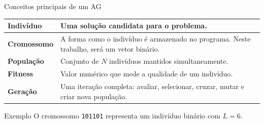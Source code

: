 \documentclass[aspectratio=169,11pt]{beamer}
\newcommand{\bits}[1]{\texttt{#1}}
\begin{document}

\begin{frame}{Conceitos principais de um AG}

    \vspace{0.05cm}

    \renewcommand{\arraystretch}{1.25}
    \begin{tabularx}{\textwidth}{>{\bfseries}p{} X}
        Indivíduo & Uma solução candidata para o problema. \\
        \hline
        Cromossomo & A forma como o indivíduo é armazenado no programa. Neste trabalho, será um vetor binário. \\
        \hline
        População & Conjunto de $N$ indivíduos mantidos simultaneamente. \\
        \hline
        Fitness & Valor numérico que mede a qualidade de um indivíduo. \\
        \hline
        Geração & Uma iteração completa: avaliar, selecionar, cruzar, mutar e criar nova população. \\
    \end{tabularx}

    \vspace{0.25cm}

    \begin{questionbox}{Exemplo}
        O cromossomo \bits{101101} representa um indivíduo binário com $L=6$.
    \end{questionbox}

\end{frame}

\end{document}
